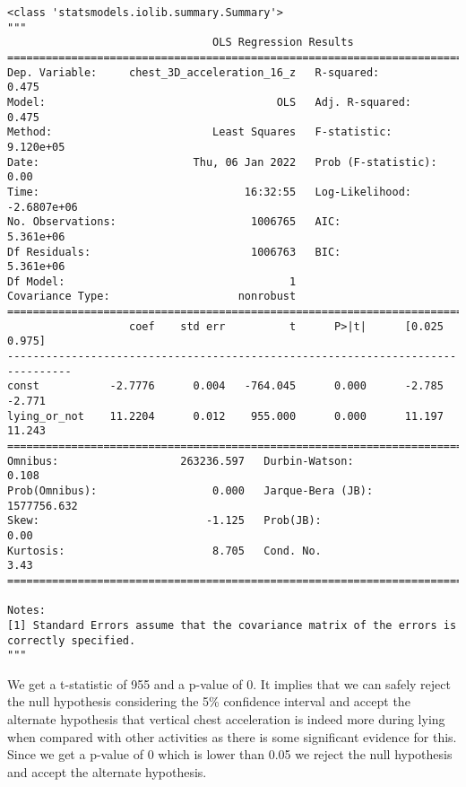 \documentclass[11pt]{article}
\begin{document}
    
    \begin{verbatim}
<class 'statsmodels.iolib.summary.Summary'>
"""
                                OLS Regression Results                                
======================================================================================
Dep. Variable:     chest_3D_acceleration_16_z   R-squared:                       0.475
Model:                                    OLS   Adj. R-squared:                  0.475
Method:                         Least Squares   F-statistic:                 9.120e+05
Date:                        Thu, 06 Jan 2022   Prob (F-statistic):               0.00
Time:                                16:32:55   Log-Likelihood:            -2.6807e+06
No. Observations:                     1006765   AIC:                         5.361e+06
Df Residuals:                         1006763   BIC:                         5.361e+06
Df Model:                                   1                                         
Covariance Type:                    nonrobust                                         
================================================================================
                   coef    std err          t      P>|t|      [0.025      0.975]
--------------------------------------------------------------------------------
const           -2.7776      0.004   -764.045      0.000      -2.785      -2.771
lying_or_not    11.2204      0.012    955.000      0.000      11.197      11.243
==============================================================================
Omnibus:                   263236.597   Durbin-Watson:                   0.108
Prob(Omnibus):                  0.000   Jarque-Bera (JB):          1577756.632
Skew:                          -1.125   Prob(JB):                         0.00
Kurtosis:                       8.705   Cond. No.                         3.43
==============================================================================

Notes:
[1] Standard Errors assume that the covariance matrix of the errors is correctly specified.
"""
    \end{verbatim}

    
    We get a t-statistic of 955 and a p-value of 0. It implies that we can
safely reject the null hypothesis considering the 5\% confidence
interval and accept the alternate hypothesis that vertical chest
acceleration is indeed more during lying when compared with other
activities as there is some significant evidence for this. Since we get
a p-value of 0 which is lower than 0.05 we reject the null hypothesis
and accept the alternate hypothesis.
\end{document}
